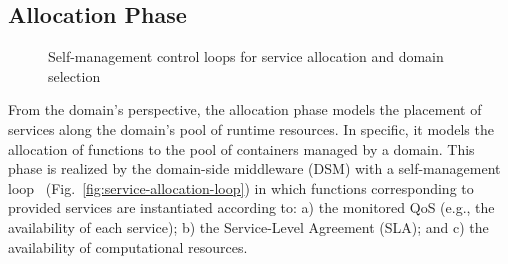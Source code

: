 
\subsection*{Allocation Phase}\label{sec:A3-E-allocation}

\begin{figure}[thbp]
	\centering
	\captionsetup[subfigure]{width=0.4\textwidth}	
	\null\hfill
	\captionsetup[subfigure]{width=0.4\textwidth}	
	\hfill
	\hfill\null
	\caption{Self-management control loops for service allocation and domain selection}\label{fig:allocation-loops}
\end{figure}

From the domain's perspective, the allocation phase models the placement of services along the domain's pool of runtime resources. In specific, it models the allocation of functions to the pool of containers managed by a domain. 
This phase is realized by the domain-side middleware (DSM) with a self-management loop~\cite{kephart2003vision} (Fig.~\ref{fig:service-allocation-loop}) in which functions corresponding to provided services are instantiated according to: a) the monitored QoS (e.g., the availability of each service); b) the Service-Level Agreement (SLA); and c) the availability of computational resources. 

